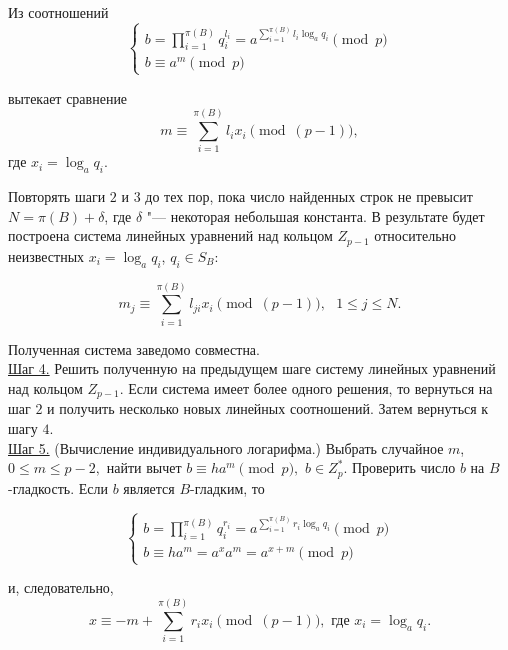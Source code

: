 \documentclass[bachelor, och, labwork]{shiza}
\begin{document}
            Из соотношений
            \[\begin{cases}
                b = \prod_{i=1}^{\pi(B)} q_i^{l_i} = a^{\sum_{i=1}^{\pi(B)} l_i \log_a q_i} \pmod p\\
                b \equiv a^m \pmod p
            \end{cases}\]

            вытекает сравнение $$m \equiv \sum_{i=1}^{\pi(B)} l_i x_i \pmod {(p
            - 1)},$$ где $x_i = \log_a q_i$.
            
            Повторять шаги $2$ и $3$ до тех пор, пока число найденных строк не
            превысит $N = \pi(B) + \delta$, где $\delta$ "--- некоторая
            небольшая константа. В результате будет построена система линейных
            уравнений над кольцом $Z_{p - 1}$ относительно неизвестных $x_i =
            \log_a q_i$, $q_i \in S_B:$
            
            $$m_j \equiv \sum_{i = 1}^{\pi(B)} l_{ji} x_i \pmod {(p - 1)}, \text{ } 1 \leq j \leq N.$$
            
            Полученная система заведомо совместна.\\
            \underline{Шаг 4.} Решить полученную на предыдущем шаге систему
            линейных уравнений над кольцом $Z_{p - 1}$. Если система имеет более
            одного решения, то вернуться на шаг $2$ и получить несколько новых
            линейных соотношений. Затем вернуться к шагу $4$.\\
            \underline{Шаг 5.} (Вычисление индивидуального логарифма.) Выбрать
            случайное $m$, $0 \leq m \leq p - 2,$ найти вычет $b \equiv ha^m
            \pmod p,$ $b \in Z_p^*.$ Проверить число $b$ на $B$-гладкость. Если
            $b$ является $B$-гладким, то
            
            \[\begin{cases} b = \prod_{i=1}^{\pi(B)} q_i^{r_i} =
                a^{\sum_{i=1}^{\pi(B)} r_i \log_a q_i} \pmod p\\
                b \equiv h a^m = a^x a^m = a^{x + m} \pmod p
            \end{cases}\]
            
            и, следовательно, \[x \equiv -m + \sum_{i=1}^{\pi(B)} r_i x_i \pmod
            {(p - 1)}, \text{ где } x_i = \log_a q_i.\]
\end{document}
